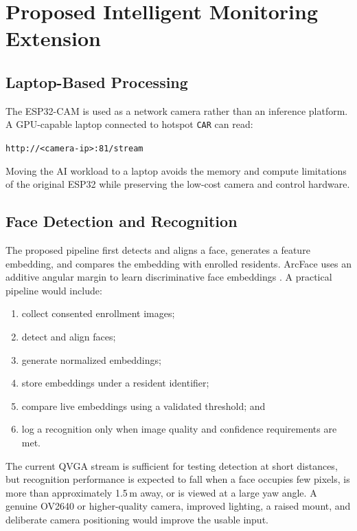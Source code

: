 \documentclass[12pt,a4paper,oneside]{report}
\newcommand{\code}[1]{\texttt{#1}}
\begin{document}
\chapter{Proposed Intelligent Monitoring Extension}
\label{ch:ai}

\section{Laptop-Based Processing}
The ESP32-CAM is used as a network camera rather than an inference platform.
A GPU-capable laptop connected to hotspot \code{CAR} can read:

\begin{center}
\code{http://<camera-ip>:81/stream}
\end{center}

Moving the AI workload to a laptop avoids the memory and compute limitations of
the original ESP32 while preserving the low-cost camera and control hardware.

\section{Face Detection and Recognition}
The proposed pipeline first detects and aligns a face, generates a feature
embedding, and compares the embedding with enrolled residents. ArcFace uses an
additive angular margin to learn discriminative face embeddings
\cite{arcface}. A practical pipeline would include:

\begin{enumerate}
  \item collect consented enrollment images;
  \item detect and align faces;
  \item generate normalized embeddings;
  \item store embeddings under a resident identifier;
  \item compare live embeddings using a validated threshold; and
  \item log a recognition only when image quality and confidence requirements
        are met.
\end{enumerate}

The current QVGA stream is sufficient for testing detection at short distances,
but recognition performance is expected to fall when a face occupies few
pixels, is more than approximately 1.5\,m away, or is viewed at a large yaw
angle. A genuine OV2640 or higher-quality camera, improved lighting, a raised
mount, and deliberate camera positioning would improve the usable input.
\end{document}
